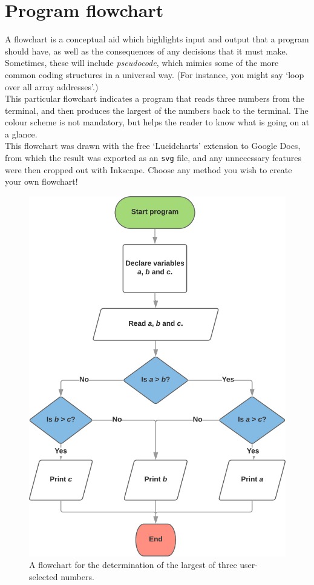 \chapter{Program flowchart}\label{app:flowchart}

A flowchart is a conceptual aid which highlights input and output that a program should have, as well as the consequences of any decisions that it must make. Sometimes, these will include \textit{pseudocode}, which mimics some of the more common coding structures in a universal way. (For instance, you might say `loop over all array addresses'.)\\

This particular flowchart indicates a program that reads three numbers from the terminal, and then produces the largest of the numbers back to the terminal. The colour scheme is not mandatory, but helps the reader to know what is going on at a glance.\\

This flowchart was drawn with the free `Lucidcharts' extension to Google Docs, from which the result was exported as an \texttt{svg} file, and any unnecessary features were then cropped out with Inkscape. Choose any method you wish to create your own flowchart!

\begin{figure}[h!]
\begin{center}
\includegraphics[width=0.50\linewidth]{figures/flowchart.pdf}
\end{center}
\caption{A flowchart for the determination of the largest of three user-selected numbers.}
\label{fig:flowchart}
\end{figure} 